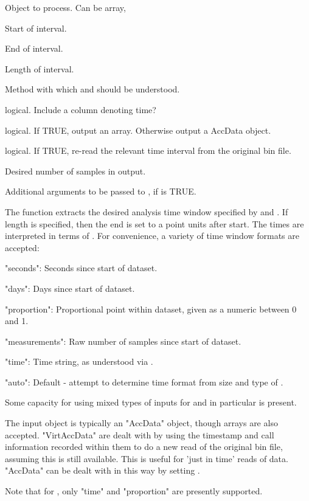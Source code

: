 \documentclass[a4paper]{book}
\begin{document}
%
\begin{Arguments}
\begin{ldescription}
\item[\code{x}] Object to process. Can be array, 
\item[\code{start}] Start of interval.
\item[\code{end}] End of interval.
\item[\code{length}] Length of interval.
\item[\code{time.format}] Method with which  and  should be understood.
\item[\code{incl.date}] logical. Include a column denoting time?
\item[\code{simplify}] logical. If TRUE, output an array. Otherwise output a AccData object.
\item[\code{read.from.file}] logical. If TRUE, re-read the relevant time interval from the original bin file.
\item[\code{size}] Desired number of samples in output.
\item[\code{...}] Additional arguments to be passed to , if  is TRUE.
\end{ldescription}
\end{Arguments}
%
\begin{Details}\relax
The function extracts the desired analysis time window specified by  and . If length is specified, then the end is set to a point  units after start. The times are interpreted in terms of . For convenience, a variety of time window formats are accepted:

"seconds": Seconds since start of dataset.

"days": Days since start of dataset.

"proportion": Proportional point within dataset, given as a numeric between 0 and 1.

"measurements": Raw number of samples since start of dataset.

"time": Time string, as understood via .

"auto": Default - attempt to determine time format from size and type of .

Some capacity for using mixed types of inputs for  and  in particular is present.

The input object  is typically an "AccData" object, though arrays are also accepted. "VirtAccData" are dealt with by using the timestamp and call information recorded within them to do a new read of the original bin file, assuming this is still available. This is useful for 'just in time' reads of data. "AccData" can be dealt with in this way by setting .

Note that for , only "time" and "proportion"  are presently supported.

\end{Details}
\end{document}
